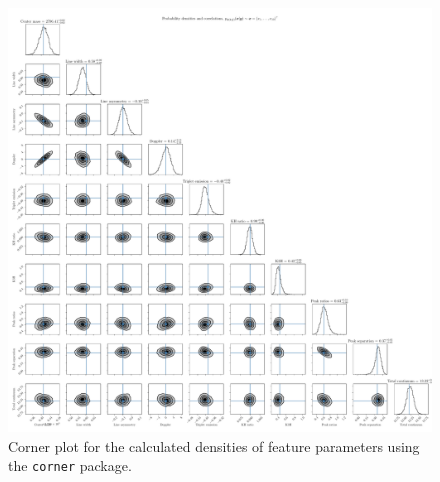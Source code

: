 \documentclass[a4paper,12pt]{report}
\begin{document}
\begin{figure}[h!]
\centering
\includegraphics[width=\textwidth]{figures/nf-feature-extraction-example-1-corner.pdf}
\cprotect\caption{Corner plot for the calculated densities of feature parameters using the \verb|corner| package.}
\label{fig:nf-feature-extraction-example-1-corner}
\end{figure}
\end{document}
